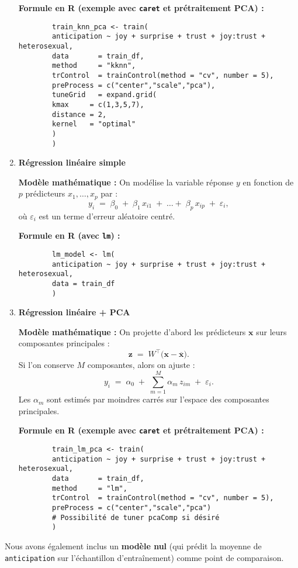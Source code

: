 \documentclass[11pt]{article}
\begin{document}
\begin{enumerate}
	\textbf{Formule en R (exemple avec \texttt{caret} et prétraitement PCA) :}
	\begin{verbatim}
		train_knn_pca <- train(
		anticipation ~ joy + surprise + trust + joy:trust + heterosexual,
		data       = train_df,
		method     = "kknn",
		trControl  = trainControl(method = "cv", number = 5),
		preProcess = c("center","scale","pca"),
		tuneGrid   = expand.grid(
		kmax     = c(1,3,5,7),
		distance = 2,
		kernel   = "optimal"
		)
		)
	\end{verbatim}
	
	\item \textbf{Régression linéaire simple}
	
	\textbf{Modèle mathématique :}  
	On modélise la variable réponse \(y\) en fonction de \(p\) prédicteurs \(x_1,\dots,x_p\) par :
	\[
	y_i \;=\; \beta_0 \;+\; \beta_1\,x_{i1} \;+\;\dots+\;\beta_p\,x_{ip} \;+\; \varepsilon_i,
	\]
	où \(\varepsilon_i\) est un terme d'erreur aléatoire centré.
	
	\textbf{Formule en R (avec \texttt{lm}) :}
	\begin{verbatim}
		lm_model <- lm(
		anticipation ~ joy + surprise + trust + joy:trust + heterosexual,
		data = train_df
		)
	\end{verbatim}
	
	\item \textbf{Régression linéaire + PCA}
	
	\textbf{Modèle mathématique :}  
	On projette d'abord les prédicteurs \(\mathbf{x}\) sur leurs composantes principales :
	\[
	\mathbf{z}
	\;=\;
	W^\top \bigl(\mathbf{x} - \overline{\mathbf{x}}\bigr).
	\]
	Si l'on conserve \(M\) composantes, alors on ajuste :
	\[
	y_i \;=\; \alpha_0 \;+\; \sum_{m=1}^M \alpha_m\,z_{im} \;+\; \varepsilon_i.
	\]
	Les \(\alpha_m\) sont estimés par moindres carrés sur l’espace des composantes principales.
	
	\textbf{Formule en R (exemple avec \texttt{caret} et prétraitement PCA) :}
	\begin{verbatim}
		train_lm_pca <- train(
		anticipation ~ joy + surprise + trust + joy:trust + heterosexual,
		data       = train_df,
		method     = "lm",
		trControl  = trainControl(method = "cv", number = 5),
		preProcess = c("center","scale","pca")
		# Possibilité de tuner pcaComp si désiré
		)
	\end{verbatim}
\end{enumerate}

Nous avons également inclus un \textbf{modèle nul} (qui prédit la moyenne de \texttt{anticipation} sur l'échantillon d'entraînement) comme point de comparaison.
\end{document}
